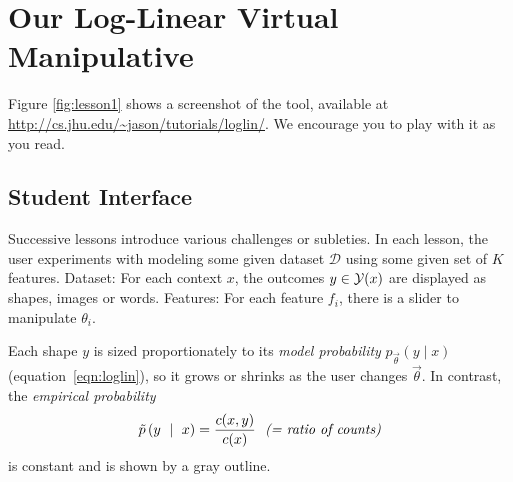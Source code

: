 \documentclass[11pt,letterpaper]{article}
\newcommand{\Note}[1]{}
\newcommand{\NoteSigned}[3]{{\sethlcolor{#2}\Note{#1: #3}}}
\newcommand{\NoteJE}[1]{\NoteSigned{JE}{LightGreen}{#1}}
\newcommand{\Commented}[1]{#1}
\newcommand{\empirical}[0]{\ensuremath{\tilde{p}}}
\newcommand{\Data}[0]{\ensuremath{\mathcal{D}}}
\newcommand{\WhereToFind}[0]{\url{http://cs.jhu.edu/~jason/tutorials/loglin/}}
\begin{document}

\section{Our Log-Linear Virtual Manipulative}\label{sec:overview}

Figure \ref{fig:lesson1} shows a screenshot
of the tool, available at 
\WhereToFind{}. We encourage you to play with it as you read.



\subsection{Student Interface}

Successive lessons introduce various challenges or subleties.  In each lesson, the user 
experiments with modeling some given dataset \Data{} using some
given set of $K$ features.  
Dataset: For each context $x$, the outcomes $y \in {\cal Y}(x)$ are
displayed as shapes, images or words.
Features: For each feature $f_i$, there is a slider to manipulate $\theta_i$.


Each shape $y$ is sized proportionately to its {\em model
probability} $p_{\vec{\theta}}(y \mid x)$ (equation~\eqref{eqn:loglin}), so it grows or shrinks as the user changes
$\vec{\theta}$.  
In contrast, the {\em empirical probability} 
\begin{equation}
\empirical\left(y\ \mid\ x\right) = \frac{c(x,y)}{c(x)} \ \ \text{\it (= ratio of counts)}
\label{eqn:empirical_distr}
\end{equation} 
is constant and is shown by a gray outline.
\end{document}
